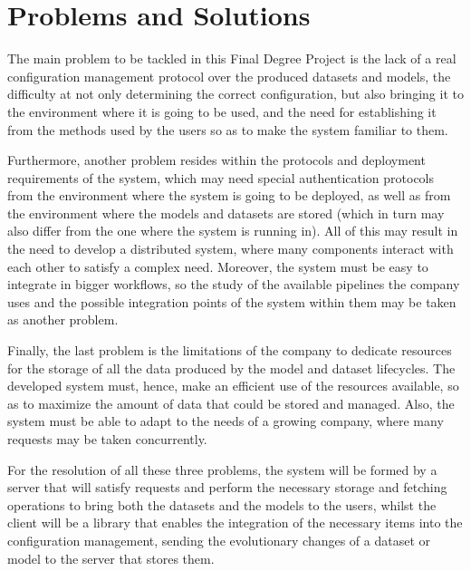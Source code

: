 \section{Problems and Solutions}

The main problem to be tackled in this Final Degree Project is the lack of a real configuration management protocol over the produced datasets and models, the difficulty at
not only determining the correct configuration, but also bringing it to the environment where it is going to be used, and the need for establishing it from the methods used
by the users so as to make the system familiar to them.

Furthermore, another problem resides within the protocols and deployment requirements of the system, which may need special authentication protocols from
the environment where the system is going to be deployed, as well as from the environment where the models and datasets are stored (which in turn may also differ
from the one where the system is running in). All of this may result in the need to develop a distributed system, where many components interact with each other
to satisfy a complex need. Moreover, the system must be easy to integrate in bigger workflows, so the study of the available pipelines the company uses and the 
possible integration points of the system within them may be taken as another problem.

Finally, the last problem is the limitations of the company to dedicate resources for the storage of all the data produced by the model and dataset lifecycles.
The developed system must, hence, make an efficient use of the resources available, so as to maximize the amount of data that could be stored and managed. Also,
the system must be able to adapt to the needs of a growing company, where many requests may be taken concurrently.

For the resolution of all these three problems, the system will be formed by a server that will satisfy requests and perform the necessary storage and
fetching operations to bring both the datasets and the models to the users, whilst the client will be a library that enables the integration of the
necessary items into the configuration management, sending the evolutionary changes of a dataset or model to the server that stores them.


